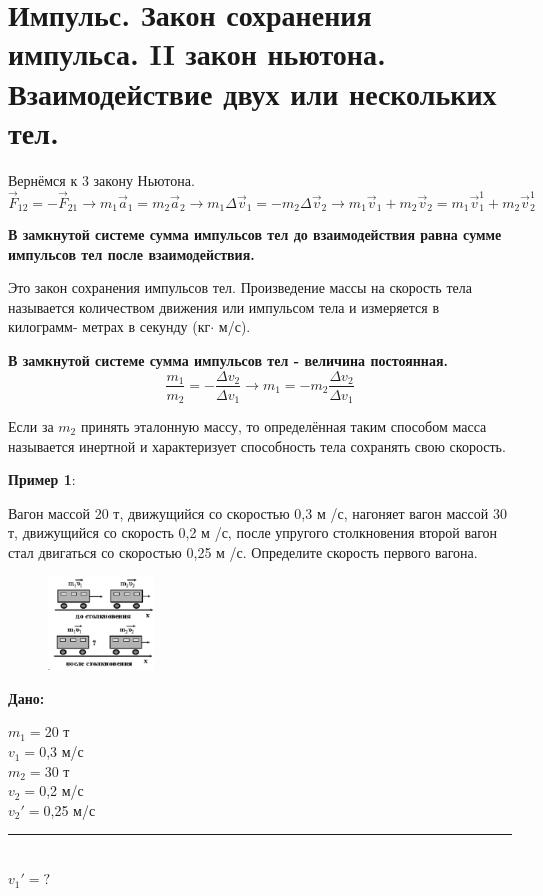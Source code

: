 \documentclass[a5paper, 10pt]{diss_4}
\renewcommand{\'}{\,'}
\begin{document}
\section{Импульс. Закон сохранения импульса. II закон ньютона.
Взаимодействие двух или нескольких тел.}

Вернёмся к 3 закону Ньютона.
\[
\vec{F}_12=-\vec{F}_21\to m_1\vec{a}_1=m_2\vec{a}_2\to
m_1\Delta\vec{v}_1=-m_2\Delta\vec{v}_2\to
m_1\vec{v}_1+m_2\vec{v}_2=m_1\vec{v}_1^1+m_2\vec{v}_2^1
\]

  \textbf{В замкнутой системе сумма импульсов тел до взаимодействия равна сумме
импульсов тел после взаимодействия.}

  Это закон сохранения импульсов тел. Произведение массы на скорость тела
называется количеством движения или импульсом тела и измеряется в килограмм-
метрах в секунду (кг$\cdot$ м/с).

\textbf{  В замкнутой системе сумма импульсов тел - величина
постоянная. }
\[
\frac{m_1}{m_2}=-\frac{\Delta v_2}{\Delta v_1}\to
m_1=-m_2\frac{\Delta v_2}{\Delta v_1}
\]

 Если за $m_2$ принять эталонную массу, то определённая таким способом масса
называется инертной и характеризует способность тела сохранять свою скорость.

\textbf{Пример 1}:

 Вагон массой 20 т, движущийся со скоростью 0,3 м /с, нагоняет вагон массой 30
т, движущийся со скорость 0,2 м /с, после упругого столкновения второй вагон
стал двигаться со скоростью 0,25 м /с. Определите скорость первого вагона.
\begin{figure}
\includegraphics[width=0.25\textwidth]{img/img_27.eps}
\label{r27}
\end{figure}

\hspace{1cm}\textbf{Дано:}\hspace{.3cm}
\parbox[t]{4cm}{
$m_1=$20 т\\
$v_1=$0,3 м/с\\
$m_2=$30 т\\
$v_2=$0,2 м/с\\
$v_2'=$0,25 м/с\\
\rule{4cm}{.4pt}\\
$v_1'=?$\\
}
\end{document}
